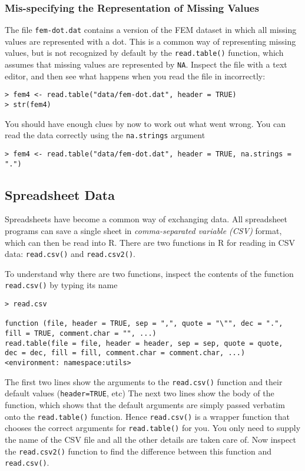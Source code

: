 \documentclass[12pt]{article}
\begin{document}
\subsubsection{Mis-specifying the Representation of Missing Values}
The file \texttt{fem-dot.dat} contains a version of the FEM dataset in which all missing values are
represented with a dot. This is a common way of representing missing values, but is not
recognized by default by the \texttt{read.table()} function, which assumes that missing values are represented by \texttt{NA}.
Inspect the file with a text editor, and then see what happens when you read the file in
incorrectly:


\begin{verbatim}
> fem4 <- read.table("data/fem-dot.dat", header = TRUE)
> str(fem4)
\end{verbatim}

You should have enough clues by now to work out what went wrong.
You can read the data correctly using the \texttt{na.strings} argument

\begin{verbatim}
> fem4 <- read.table("data/fem-dot.dat", header = TRUE, na.strings = ".")
\end{verbatim}

\subsection{Spreadsheet Data}
Spreadsheets have become a common way of exchanging data. All spreadsheet programs can save
a single sheet in \emph{comma-separated variable (CSV)} format, which can then be read into R. There
are two functions in R for reading in CSV data: \texttt{read.csv()} and \texttt{read.csv2()}.

To understand why there are two functions, inspect the contents of the function \texttt{read.csv()} by
typing its name

\begin{verbatim}
> read.csv

function (file, header = TRUE, sep = ",", quote = "\"", dec = ".",
fill = TRUE, comment.char = "", ...)
read.table(file = file, header = header, sep = sep, quote = quote,
dec = dec, fill = fill, comment.char = comment.char, ...)
<environment: namespace:utils>
\end{verbatim}

The first two lines show the arguments to the \texttt{read.csv()} function and their default values
(\texttt{header=TRUE}, etc) The next two lines show the body of the function, which shows that the
default arguments are simply passed verbatim onto the \texttt{read.table()} function. Hence
\texttt{read.csv()} is a wrapper function that chooses the correct arguments for \texttt{read.table()} for you.
You only need to supply the name of the CSV file and all the other details are taken care of.
Now inspect the \texttt{read.csv2()} function to find the difference between this function and \texttt{read.csv()}.
\end{document}
